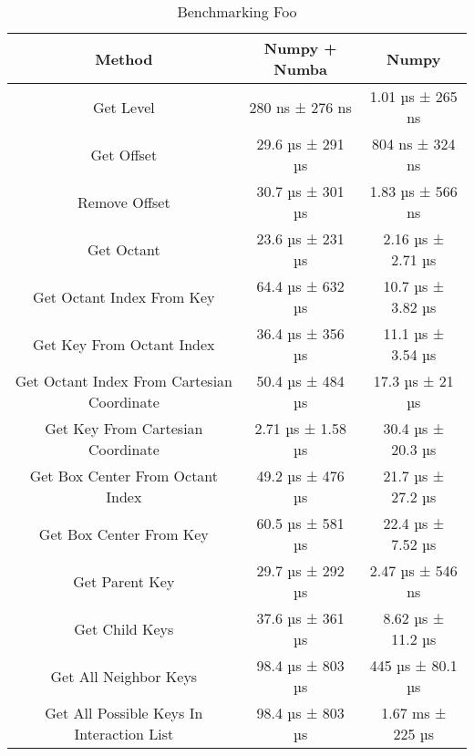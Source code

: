 \begin{table}[ht]
    \centering %
    \begin{tabular}{c c c} %
    \hline\hline %
    Method & Numpy + Numba & Numpy \\ [0.5ex] %
    \hline %
    Get Level & 280 ns ± 276 ns  & 1.01 µs ± 265 ns \\ %
    Get Offset & 29.6 µs ± 291 µs & 804 ns ± 324 ns \\
    Remove Offset & 30.7 µs ± 301 µs & 1.83 µs ± 566 ns \\
    Get Octant & 23.6 µs ± 231 µs & 2.16 µs ± 2.71 µs \\
    Get Octant Index From Key & 64.4 µs ± 632 µs & 10.7 µs ± 3.82 µs \\
    Get Key From Octant Index & 36.4 µs ± 356 µs & 11.1 µs ± 3.54 µs \\
    Get Octant Index From Cartesian Coordinate & 50.4 µs ± 484 µs & 17.3 µs ± 21 µs \\
    Get Key From Cartesian Coordinate & 2.71 µs ± 1.58 µs & 30.4 µs ± 20.3 µs \\
    Get Box Center From Octant Index & 49.2 µs ± 476 µs & 21.7 µs ± 27.2 µs \\
    Get Box Center From Key & 60.5 µs ± 581 µs & 22.4 µs ± 7.52 µs \\
    Get Parent Key & 29.7 µs ± 292 µs & 2.47 µs ± 546 ns \\
    Get Child Keys & 37.6 µs ± 361 µs & 8.62 µs ± 11.2 µs \\
    Get All Neighbor Keys & 98.4 µs ± 803 µs & 445 µs ± 80.1 µs\\
    Get All Possible Keys In Interaction List & 98.4 µs ± 803 µs & 1.67 ms ± 225 µs \\ [1ex] %
    \hline %
    \end{tabular}
    \label{table:3_1_jit} %
    \caption{Benchmarking Foo} %
\end{table}


